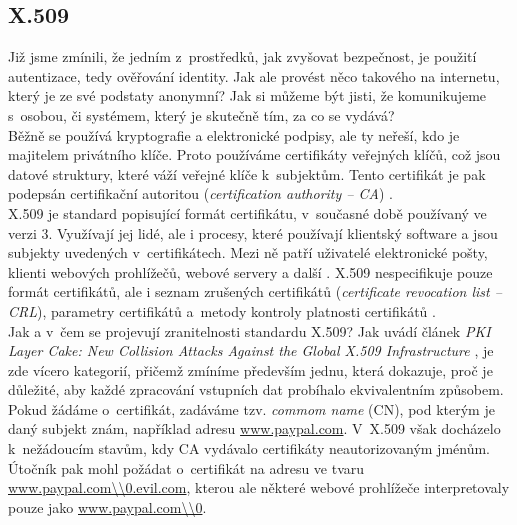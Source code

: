 \subsection{X.509} \label{subsec:3:x509}
Již jsme zmínili, že jedním z~prostředků, jak zvyšovat bezpečnost, je použití autentizace, tedy ověřování identity. Jak ale provést něco takového 
na internetu, který je ze své podstaty anonymní? Jak si můžeme být jisti, že komunikujeme s~osobou, či systémem, který je skutečně tím, za co se vydává? \\

Běžně se používá kryptografie a elektronické podpisy, ale ty neřeší, kdo je majitelem privátního klíče. Proto používáme certifikáty veřejných klíčů, 
což jsou datové struktury, které váží veřejné klíče k~subjektům. Tento certifikát je pak podepsán certifikační autoritou 
(\textit{certification authority -- CA}) \cite[str. 9-10]{RFC:X509}. \\

X.509 je standard popisující formát certifikátu, v~současné době používaný ve verzi 3. \mbox{Využívají} jej lidé, ale i procesy, které používají 
klientský software a jsou subjekty uvedených v~certifikátech. Mezi ně patří uživatelé elektronické pošty, klienti webových prohlížečů, webové 
servery a další \cite[str. 9-10]{RFC:X509}. X.509 nespecifikuje pouze formát certifikátů, ale i seznam zrušených certifikátů 
(\textit{certificate revocation list -- CRL}), parametry certifikátů a~metody kontroly platnosti certifikátů \cite[str. 130]{Slovnik2015}. \\

Jak a v~čem se projevují zranitelnosti standardu X.509? Jak uvádí článek \textit{PKI Layer Cake: New Collision Attacks Against the Global X.509 Infrastructure} 
\cite[str. 1]{Kaminsky2010}, je zde vícero kategorií, přičemž zmíníme především jednu, která dokazuje, proč je důležité, aby každé zpracování vstupních
dat probíhalo ekvivalentním způsobem. \\

Pokud žádáme o~certifikát, zadáváme tzv. \textit{commom name} (CN), pod kterým je daný subjekt znám, 
například adresu \url{www.paypal.com}. V~X.509 však docházelo k~nežádoucím stavům, kdy CA vydávalo certifikáty neautorizovaným jménům. 
Útočník pak mohl požádat o~certifikát na adresu ve tvaru \url{www.paypal.com\\0.evil.com}, kterou ale některé webové prohlížeče interpretovaly 
pouze jako \url{www.paypal.com\\0}. \\

